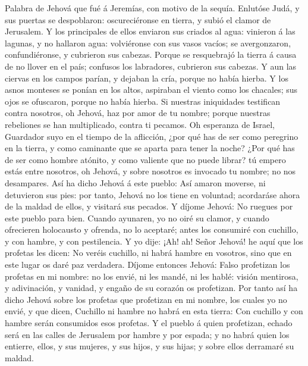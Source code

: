  Palabra de Jehová que fué á Jeremías, con motivo de la
sequía.  Enlutóse Judá, y sus puertas se despoblaron:
oscureciéronse en tierra, y subió el clamor de Jerusalem. 
Y los principales de ellos enviaron sus criados al agua: vinieron á las
lagunas, y no hallaron agua: volviéronse con sus vasos vacíos; se
avergonzaron, confundiéronse, y cubrieron sus cabezas. 
Porque se resquebrajó la tierra á causa de no llover en el país;
confusos los labradores, cubrieron sus cabezas.  Y aun las
ciervas en los campos parían, y dejaban la cría, porque no había hierba.
 Y los asnos monteses se ponían en los altos, aspiraban el
viento como los chacales; sus ojos se ofuscaron, porque no había hierba.
 Si nuestras iniquidades testifican contra nosotros, oh
Jehová, haz por amor de tu nombre; porque nuestras rebeliones se han
multiplicado, contra ti pecamos.  Oh esperanza de Israel,
Guardador suyo en el tiempo de la aflicción, ¿por qué has de ser como
peregrino en la tierra, y como caminante que se aparta para tener la
noche?  ¿Por qué has de ser como hombre atónito, y como
valiente que no puede librar? tú empero estás entre nosotros, oh Jehová,
y sobre nosotros es invocado tu nombre; no nos desampares.
 Así ha dicho Jehová á este pueblo: Así amaron moverse,
ni detuvieron sus pies: por tanto, Jehová no los tiene en voluntad;
acordaráse ahora de la maldad de ellos, y visitará sus pecados.
 Y díjome Jehová: No ruegues por este pueblo para bien.
 Cuando ayunaren, yo no oiré su clamor, y cuando
ofrecieren holocausto y ofrenda, no lo aceptaré; antes los consumiré con
cuchillo, y con hambre, y con pestilencia.  Y yo dije:
¡Ah! ah! Señor Jehová! he aquí que los profetas les dicen: No veréis
cuchillo, ni habrá hambre en vosotros, sino que en este lugar os daré
paz verdadera.  Díjome entonces Jehová: Falso profetizan
los profetas en mi nombre: no los envié, ni les mandé, ni les hablé:
visión mentirosa, y adivinación, y vanidad, y engaño de su corazón os
profetizan.  Por tanto así ha dicho Jehová sobre los
profetas que profetizan en mi nombre, los cuales yo no envié, y que
dicen, Cuchillo ni hambre no habrá en esta tierra: Con cuchillo y con
hambre serán consumidos esos profetas.  Y el pueblo á
quien profetizan, echado será en las calles de Jerusalem por hambre y
por espada; y no habrá quien los entierre, ellos, y sus mujeres, y sus
hijos, y sus hijas; y sobre ellos derramaré su maldad. 
